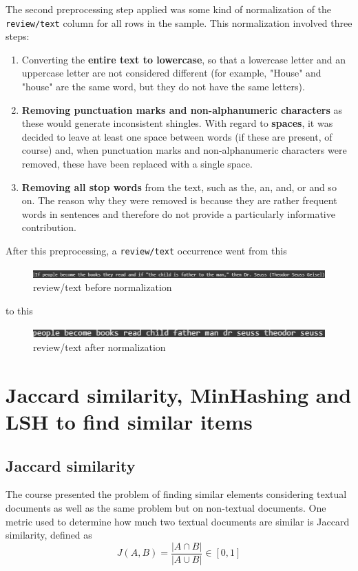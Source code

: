 \documentclass[12pt, a4paper]{article}
\begin{document}
The second preprocessing step applied was some kind of normalization of the \texttt{review/text} column for all rows in the sample. This normalization involved three steps:
\begin{enumerate}
    \item Converting the \textbf{entire text to lowercase}, so that a lowercase letter and an uppercase letter are not considered different (for example, "House" and "house" are the same word, but they do not have the same letters).
    \item \textbf{Removing punctuation marks and non-alphanumeric characters} as these would generate inconsistent shingles. With regard to \textbf{spaces}, it was decided to leave at least one space between words (if these are present, of course) and, when punctuation marks and non-alphanumeric characters were removed, these have been replaced with a single space. 
    \item \textbf{Removing all stop words} from the text, such as the, an, and, or and so on. The reason why they were removed is because they are rather frequent words in sentences and therefore do not provide a particularly informative contribution.
\end{enumerate}
After this preprocessing, a \texttt{review/text} occurrence went from this
\begin{figure}[H]
    \centering
    \includegraphics[width=\linewidth]{Screenshot 2025-09-04 103608.png}
    \caption{review/text before normalization}
    \label{fig:placeholder}
\end{figure}
to this
\begin{figure}[H]
    \centering
    \includegraphics[width=\linewidth]{Screenshot 2025-09-04 103734.png}
    \caption{review/text after normalization}
    \label{fig:placeholder}
\end{figure}

\section{Jaccard similarity, MinHashing and LSH to find similar items}
\subsection{Jaccard similarity}
The course presented the problem of finding similar elements considering textual documents as well as the same problem but on non-textual documents. One metric used to determine how much two textual documents are similar is Jaccard similarity, defined as
\begin{equation}
J(A,B) = \frac{|A \cap B |}{|A \cup B|} \in [0,1]
\end{equation}
\end{document}
